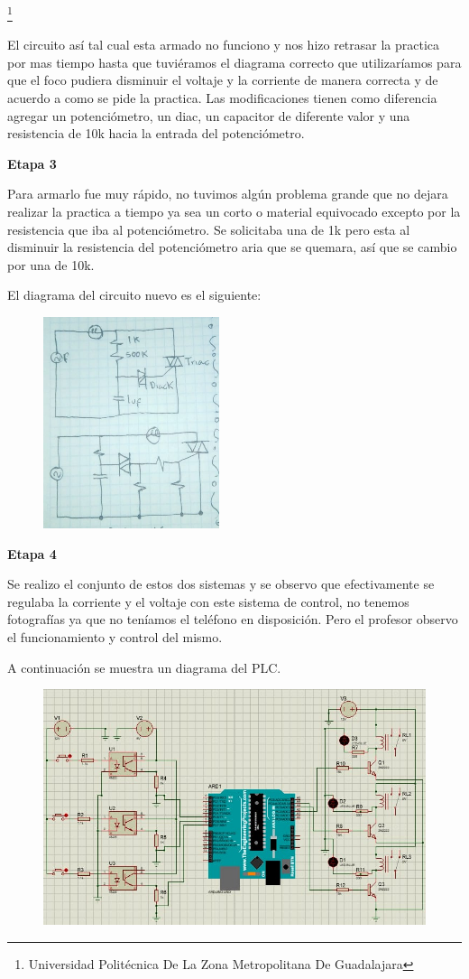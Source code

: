 \documentclass[10pt,a4paper]{article}
\begin{document}
\footnote{Universidad Politécnica De La Zona Metropolitana De Guadalajara}
\newpage

El circuito así tal cual esta armado no funciono y nos hizo retrasar la practica por mas tiempo hasta que tuviéramos el diagrama correcto que utilizaríamos para que el foco pudiera disminuir el voltaje y la corriente de manera correcta y de acuerdo a como se pide la practica. Las modificaciones tienen como diferencia agregar un potenciómetro, un diac, un capacitor de diferente valor y una resistencia de 10k hacia la entrada del potenciómetro.

\textbf{Etapa 3}

Para armarlo fue muy rápido, no tuvimos algún problema grande que no dejara realizar la practica a tiempo ya sea un corto o material equivocado excepto por la resistencia que iba al potenciómetro. Se solicitaba una de 1k pero esta al disminuir la resistencia del potenciómetro aria que se quemara, así que se cambio por una de 10k.

El diagrama del circuito nuevo es el siguiente:


\begin{figure}[hbtp]
\centering
\includegraphics[scale=0.80]{3.png}
\end{figure}

\textbf{Etapa 4}

Se realizo el conjunto de estos dos sistemas y se observo que efectivamente se regulaba la corriente y el voltaje con este sistema de control, no tenemos fotografías ya que no teníamos el teléfono en disposición. Pero el profesor observo el funcionamiento y control del mismo.

A continuación se muestra un diagrama del PLC.


\begin{figure}[hbtp]
\centering
\includegraphics[scale=0.60]{Diagrama.png}
\end{figure}
\end{document}
